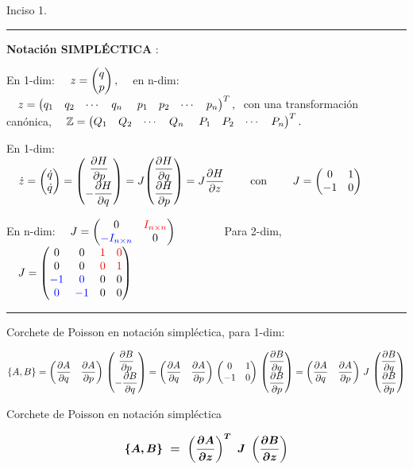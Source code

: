 \vspace{5mm} Inciso 1. $\quad$  \rule{150pt}{0.1pt} 

\textbf{ Notación SIMPLÉCTICA} : 

En 1-dim: $\quad z=\mqty(q\\p)\, , \quad $ en n-dim: $\quad z=\mqty(q_1&q_2&\cdots&q_n&\ p_1& p_2& \cdots &p_n)^T\, , \ $ con una transformación canónica, $\quad \mathbb Z=\mqty(Q_1&Q_2&\cdots&Q_n&\ P_1& P_2& \cdots &P_n)^T\, . $

En 1-dim: $\quad \dot z=\mqty(\dot q \\ \dot q) = \mqty( \displaystyle \pdv{H}{p} \\ \displaystyle -\pdv{H}{q} )= J \mqty( \displaystyle \pdv{H}{q} \\ \displaystyle \pdv{H}{p} )=J \displaystyle \pdv{H}{z} \qquad\text{ con } \qquad J=\mqty(0&1\\-1&0)$

En n-dim: $\quad J=\mqty(0&\textcolor{red}{I_{n\times n}} \\ \textcolor{blue}{-I_{n\times n}} &0)\qquad \qquad$
Para 2-dim, $\quad J=\mqty(0&0& \textcolor{red}{1} & \textcolor{red}{0}\\
0&0&\textcolor{red}{0}&\textcolor{red}{1} \\
\textcolor{blue}{-1} & \textcolor{blue}{0}&0&0 \\
\textcolor{blue}{0}&\textcolor{blue}{-1}&0&0 ) $


\begin{flushright}\rule{200pt}{0.1pt}\end{flushright}

Corchete de Poisson en notación simpléctica, para 1-dim:

$\{A,B\} =  \mqty( \displaystyle \pdv{A}{q}&\displaystyle \pdv{A}{p}) \ \mqty ( \displaystyle \pdv{B}{p}\\\displaystyle -\pdv{B}{q}) = \mqty(\displaystyle \pdv{A}{q}&\displaystyle \pdv{A}{p}) \ \mqty(0&1\\-1&0) \ \mqty(\displaystyle \pdv{B}{q} \\ \displaystyle \pdv{B}{p}) =\mqty( \displaystyle \pdv{A}{q}&\displaystyle \pdv{A}{p}) \ J \ \mqty(\displaystyle \pdv{B}{q} \\ \displaystyle \pdv{B}{p})$

\vspace{5mm}
\begin{myblock}{Corchete de Poisson en notación simpléctica}
\begin{large}
\begin{equation}
\label{T20CPenNS}
\boldsymbol{
\{A,B\} \ = \displaystyle \  \left( \pdv{A}{z} \right)^T \ J \ \left( \pdv{B}{z} \right)
}	
\end{equation}	
\end{large}	
\end{myblock}


